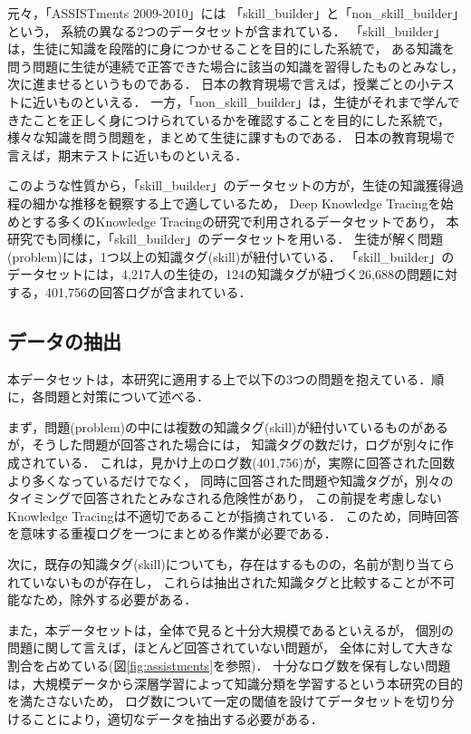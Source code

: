 元々，「ASSISTments 2009-2010」には
「skill\_builder」と「non\_skill\_builder」という，
系統の異なる2つのデータセットが含まれている．
「skill\_builder」は，生徒に知識を段階的に身につかせることを目的にした系統で，
ある知識を問う問題に生徒が連続で正答できた場合に該当の知識を習得したものとみなし，次に進ませるというものである．
日本の教育現場で言えば，授業ごとの小テストに近いものといえる．
一方，「non\_skill\_builder」は，生徒がそれまで学んできたことを正しく身につけられているかを確認することを目的にした系統で，
様々な知識を問う問題を，まとめて生徒に課すものである．
日本の教育現場で言えば，期末テストに近いものといえる．

このような性質から，「skill\_builder」のデータセットの方が，生徒の知識獲得過程の細かな推移を観察する上で適しているため，
Deep Knowledge Tracing\cite{piech2015deep}を始めとする多くのKnowledge Tracingの研究で利用されるデータセットであり，
本研究でも同様に，「skill\_builder」のデータセットを用いる．
生徒が解く問題(problem)には，1つ以上の知識タグ(skill)が紐付いている．
「skill\_builder」のデータセットには，4,217人の生徒の，124の知識タグが紐づく26,688の問題に対する，401,756の回答ログが含まれている．


\subsection{データの抽出}
本データセットは，本研究に適用する上で以下の3つの問題を抱えている．順に，各問題と対策について述べる．

まず，問題(problem)の中には複数の知識タグ(skill)が紐付いているものがあるが，そうした問題が回答された場合には，
知識タグの数だけ，ログが別々に作成されている．
これは，見かけ上のログ数(401,756)が，実際に回答された回数より多くなっているだけでなく，
同時に回答された問題や知識タグが，別々のタイミングで回答されたとみなされる危険性があり，
この前提を考慮しないKnowledge Tracingは不適切であることが指摘されている\cite{xiong2016going}．
このため，同時回答を意味する重複ログを一つにまとめる作業が必要である．

次に，既存の知識タグ(skill)についても，存在はするものの，名前が割り当てられていないものが存在し，
これらは抽出された知識タグと比較することが不可能なため，除外する必要がある．


また，本データセットは，全体で見ると十分大規模であるといえるが，
個別の問題に関して言えば，ほとんど回答されていない問題が，
全体に対して大きな割合を占めている(図\ref{fig:assistments}を参照)．
十分なログ数を保有しない問題は，大規模データから深層学習によって知識分類を学習するという本研究の目的を満たさないため，
ログ数について一定の閾値を設けてデータセットを切り分けることにより，適切なデータを抽出する必要がある．


